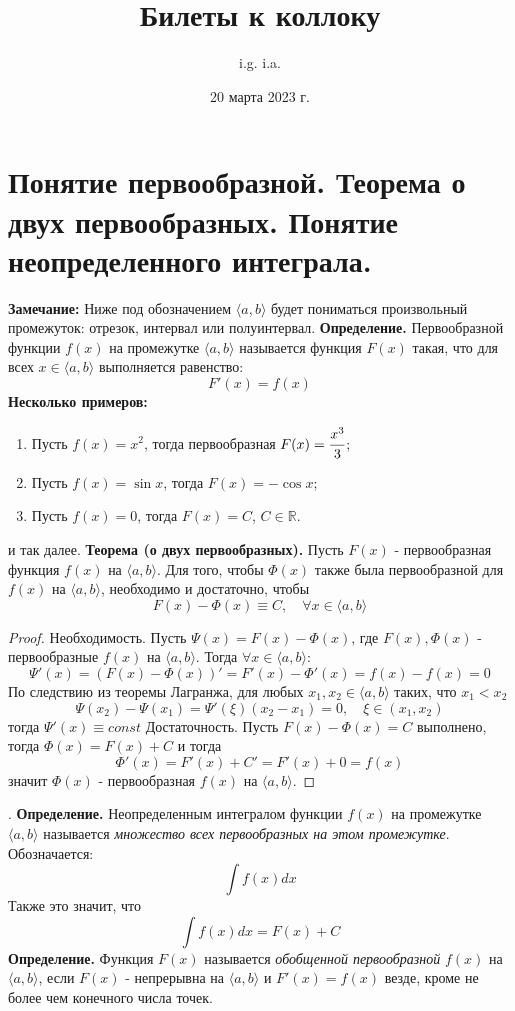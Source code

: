 \documentclass{article}
\title{\textbf{Билеты к коллоку}}
\author{i.g. i.a.}
\date{20 марта 2023 г.}
\newcommand*{\theorem}[2]{\textbf{Теорема #1. } #2 \newline}
\newcommand*{\definition}[1]{\textbf{Определение.} #1 \newline}
\newcommand*{\R}{\mathbb{R}}
\begin{document}
\tableofcontents
\maketitle

\section{Понятие первообразной. Теорема о двух первообразных. Понятие неопределенного интеграла.}

\textbf{Замечание: } Ниже под обозначением $\langle a, b \rangle$ будет пониматься произвольный промежуток: отрезок, интервал или полуинтервал.
\newline
\newline
\definition{Первообразной функции $f(x)$ на промежутке $\langle a, b \rangle$ называется функция $F(x)$ такая, что для всех $x \in \langle a, b \rangle$ выполняется равенство: }
$$
    F'(x) = f(x)
$$
\textbf{Несколько примеров: } 
\begin{enumerate}
    \item Пусть $f(x) = x^2$, тогда первообразная $F(x) = \cfrac{x^3}{3}$;
    \item Пусть $f(x) = \sin x$, тогда $F(x) = -\cos x$;
    \item Пусть $f(x) = 0$, тогда $F(x) = C$, $C \in \R$. 
\end{enumerate}
и так далее.
\newline 
\newline 
\theorem{(о двух первообразных)}{Пусть $F(x)$ - первообразная функция $f(x)$ на $\langle a, b \rangle$. Для того, чтобы $\Phi(x)$ также была первообразной для $f(x)$ на $\langle a, b \rangle$, необходимо и достаточно, чтобы}
$$
    F(x) - \Phi(x) \equiv C, \quad \forall x \in \langle a, b \rangle
$$
\begin{proof}
    Необходимость. Пусть $\Psi(x) = F(x) - \Phi(x)$, где $F(x), \Phi(x)$ - первообразные $f(x)$ на $\langle a, b \rangle$. Тогда $\forall x \in \langle a, b \rangle$:
    $$
        \Psi'(x) = (F(x) - \Phi(x))' = F'(x) - \Phi'(x) = f(x) - f(x) = 0
    $$
    По следствию из теоремы Лагранжа, для любых $x_1, x_2 \in \langle a,b \rangle$ таких, что $x_1 < x_2$
    $$
        \Psi(x_2) - \Psi(x_1) = \Psi'(\xi)(x_2 - x_1) = 0, \quad \xi \in (x_1, x_2) 
    $$
    тогда $\Psi'(x) \equiv const$
    \newline
    \newline 
    Достаточность. Пусть $F(x) - \Phi(x) = C$ выполнено, тогда $\Phi(x) = F(x) + C$ и тогда
    $$
        \Phi'(x) = F'(x) + C' = F'(x) + 0 = f(x)
    $$
    значит $\Phi(x)$ - первообразная $f(x)$ на $\langle a, b \rangle$.
\end{proof}
.
\newline
\definition{Неопределенным интегралом функции $f(x)$ на промежутке $\langle a, b \rangle$ называется \textit{множество всех первообразных на этом промежутке}. Обозначается:}
$$
    \int f(x)dx
$$
Также это значит, что 
$$
\int f(x)dx = F(x) + C
$$
\definition{Функция $F(x)$ называется \textit{обобщенной первообразной} $f(x)$ на $\langle a, b \rangle$, если $F(x)$ - непрерывна на $\langle a, b \rangle$ и $F'(x) = f(x)$ везде, кроме не более чем конечного числа точек.}
\end{document}
